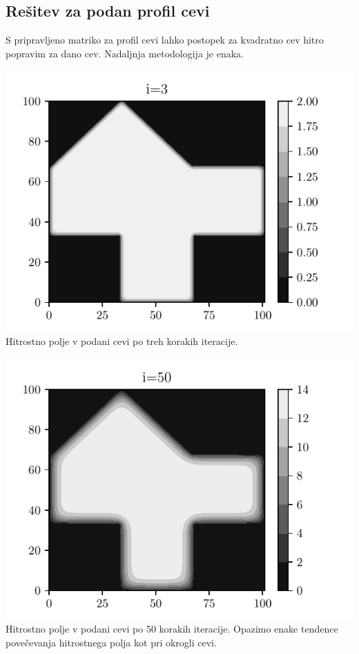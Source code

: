 \subsection{Rešitev za podan profil cevi}
S pripravljeno matriko za profil cevi lahko postopek za kvadratno cev hitro popravim za dano cev. Nadaljnja metodologija je enaka.
\begin{center}
    \begin{minipage}{0.45\textwidth}
        \centering
    \includegraphics[width=\textwidth]{../old/1-hiska_i3.pdf}
    {Hitrostno polje v podani cevi po treh korakih iteracije.}
    \end{minipage}\hfill
    \begin{minipage}{0.45\textwidth}
        \centering
        \includegraphics[width=1\textwidth]{../old/1-hiska_i50.pdf}
    {Hitrostno polje v podani cevi po 50 korakih iteracije. Opazimo enake tendence povečevanja hitrostnega polja kot pri okrogli cevi.}
    \end{minipage}


\end{center}
